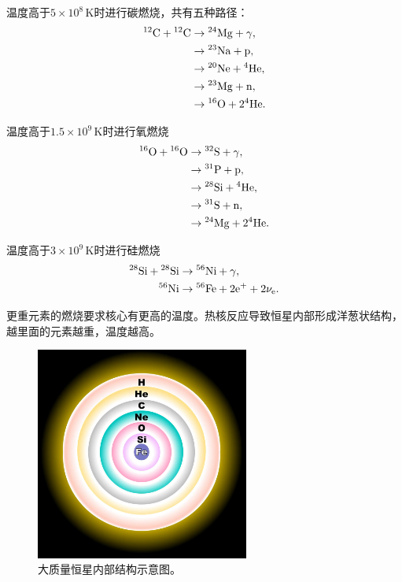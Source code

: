 \documentclass[../天体物理基础.tex]{subfiles}
\begin{document}
温度高于$5\times10^{8}\,\mathrm{K}$时进行碳燃烧，共有五种路径：
\begin{align}
{}^{12}\mathrm{C}+{}^{12}\mathrm{C}&\to{}^{24}\mathrm{Mg}+\gamma,\notag\\
&\to{}^{23}\mathrm{Na}+\mathrm{p},\notag\\
&\to{}^{20}\mathrm{Ne}+{}^{4}\mathrm{He},\notag\\
&\to{}^{23}\mathrm{Mg}+\mathrm{n},\notag\\
&\to{}^{16}\mathrm{O}+2{}^{4}\mathrm{He}.\notag
\end{align}

温度高于$1.5\times10^{9}\,\mathrm{K}$时进行氧燃烧
\begin{align}
{}^{16}\mathrm{O}+{}^{16}\mathrm{O}&\to{}^{32}\mathrm{S}+\gamma,\notag\\
&\to{}^{31}\mathrm{P}+\mathrm{p},\notag\\
&\to{}^{28}\mathrm{Si}+{}^{4}\mathrm{He},\notag\\
&\to{}^{31}\mathrm{S}+\mathrm{n},\notag\\
&\to{}^{24}\mathrm{Mg}+2{}^{4}\mathrm{He}.\notag
\end{align}

温度高于$3\times10^{9}\,\mathrm{K}$时进行硅燃烧
\begin{align}
{}^{28}\mathrm{Si}+{}^{28}\mathrm{Si}&\to{}^{56}\mathrm{Ni}+\gamma,\notag\\
{}^{56}\mathrm{Ni}&\to{}^{56}\mathrm{Fe}+2\mathrm{e}^{+}+2\nu_{\mathrm{e}}.\notag
\end{align}

更重元素的燃烧要求核心有更高的温度。热核反应导致恒星内部形成洋葱状结构，越里面的元素越重，温度越高。
\begin{figure}[!htbp]
\centering
\includegraphics[width=7cm]{figures/figure2_2.JPG}
\captionsetup{justification=raggedright, singlelinecheck=false}
\caption{大质量恒星内部结构示意图。}
\label{大质量恒星内部结构示意图。}
\end{figure}
\end{document}
